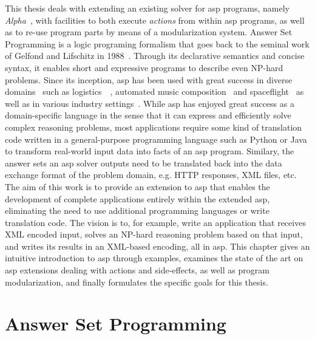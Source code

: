 This thesis deals with extending an existing solver for \gls{asp} programs, namely \emph{Alpha}~\cite{alpha}, with facilities to both execute \emph{actions} from within \gls{asp} programs, as well as to re-use program parts by means of a modularization system. Answer Set Programming is a logic programing formalism that goes back to the seminal work of Gelfond and Lifschitz in 1988~\cite{stable-models}. Through its declarative semantics and concise syntax, it enables short and expressive programs to describe even NP-hard problems. Since its inception, \gls{asp} has been used with great success in diverse domains~\cite{survey-2016} such as logistics~\cite{gioia-tauro}~\cite{train-scheduling}, automated music composition~\cite{blues-composition} and spaceflight~\cite{space-shuttle} as well as in various industry settings~\cite{industrial-asp}. While \gls{asp} has enjoyed great success as a domain-specific language in the sense that it can express and efficiently solve complex reasoning problems, most applications require some kind of translation code written in a general-purpose programming language such as Python or Java to transform real-world input data into facts of an \gls{asp} program. Similary, the answer sets an \gls{asp} solver outputs need to be translated back into the data exchange format of the problem domain, e.g. HTTP responses, XML files, etc. The aim of this work is to provide an extension to \gls{asp} that enables the development of complete applications entirely within the extended \gls{asp}, eliminating the need to use additional programming languages or write translation code. The vision is to, for example, write an application that receives XML encoded input, solves an NP-hard reasoning problem based on that input, and writes its results in an XML-based encoding, all in \gls{asp}. This chapter gives an intuitive introduction to \gls{asp} through examples, examines the state of the art on \gls{asp} extensions dealing with actions and side-effects, as well as program modularization, and finally formulates the specific goals for this thesis.

\section{Answer Set Programming}

